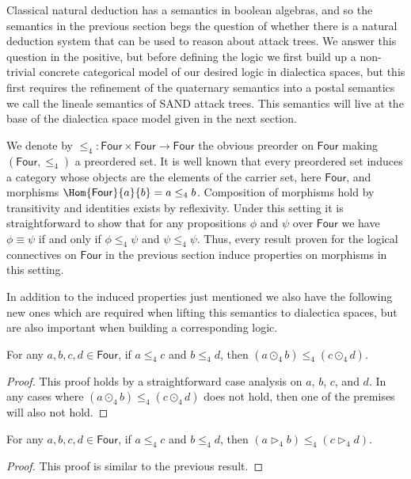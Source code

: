 Classical natural deduction has a semantics in boolean algebras, and
so the semantics in the previous section begs the question of whether
there is a natural deduction system that can be used to reason about
attack trees.  We answer this question in the positive, but before
defining the logic we first build up a non-trivial concrete
categorical model of our desired logic in dialectica spaces, but this
first requires the refinement of the quaternary semantics into a
postal semantics we call the lineale semantics of SAND attack trees.
This semantics will live at the base of the dialectica space model
given in the next section.

\newcommand{\Four}[0]{\mathsf{Four}} We denote by $\leq_4 : \Four
\times \Four \to \Four$ the obvious preorder on $\Four$ making
$(\Four, \leq_4)$ a preordered set.  It is well known that every
preordered set induces a category whose objects are the elements of
the carrier set, here $\Four$, and morphisms $\Hom{\Four}{a}{b} = a
\leq_4 b$.  Composition of morphisms hold by transitivity and
identities exists by reflexivity.  Under this setting it is
straightforward to show that for any propositions $\phi$ and $\psi$
over $\Four$ we have $\phi \equiv \psi$ if and only if $\phi \leq_4
\psi$ and $\psi \leq_4 \psi$.  Thus, every result proven for the
logical connectives on $\Four$ in the previous section induce
properties on morphisms in this setting.

In addition to the induced properties just mentioned we also have the
following new ones which are required when lifting this semantics to
dialectica spaces, but are also important when building a
corresponding logic.
\begin{lemma}
  \label{lemma:parallel_conjunction_is_functorial}
  For any $a,b,c,d \in \Four$, if $a \leq_4 c$ and $b \le_4 d$, then
  $(a \odot_4 b) \leq_4 (c \odot_4 d)$.
\end{lemma}
\begin{proof}
  This proof holds by a straightforward case analysis on $a$, $b$,
  $c$, and $d$.  In any cases where $(a \odot_4 b) \leq_4 (c \odot_4
  d)$ does not hold, then one of the premises will also not hold.
\end{proof}

\begin{lemma}
  \label{lemma:sequential_conjunction_is_functorial}
  For any $a,b,c,d \in \Four$, if $a \leq_4 c$ and $b \le_4 d$, then
  $(a \rhd_4 b) \leq_4 (c \rhd_4 d)$.
\end{lemma}
\begin{proof}
  This proof is similar to the previous result.
\end{proof}

